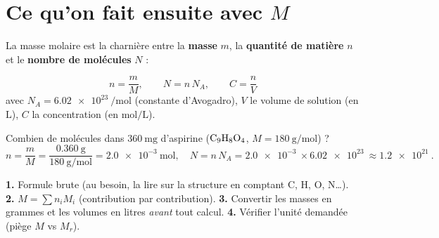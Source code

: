 \documentclass[11pt,a4paper]{article}
\begin{document}
\section{Ce qu'on fait ensuite avec $M$}
La masse molaire est la charnière entre la \textbf{masse} $m$, la \textbf{quantité de matière} $n$ et le \textbf{nombre de molécules} $N$ :
\begin{formule}
\[ n = \dfrac{m}{M}, \qquad N = n\,N_A, \qquad C = \dfrac{n}{V} \]
avec $N_A = \qty{6,02e23}{\per\mol}$ (constante d'Avogadro), $V$ le volume de solution (en $\si{\L}$), $C$ la concentration (en $\si{\mol\per\L}$).
\end{formule}

\begin{exmp}
Combien de molécules dans $\qty{360}{\mg}$ d'aspirine ($\ce{C9H8O4}$, $M=\qty{180}{\g\per\mol}$) ?
\[ n=\frac{m}{M}=\frac{\qty{0,360}{\g}}{\qty{180}{\g\per\mol}}=\qty{2,0e-3}{\mol},\quad
N=n\,N_A=\qty{2,0e-3}{}\times\qty{6,02e23}{}\approx\qty{1,2e21}{}. \]
\end{exmp}

\begin{astuce}
\textbf{1.} Formule brute (au besoin, la lire sur la structure en comptant C, H, O, N\dots). \textbf{2.} $M=\sum n_i M_i$ (contribution par contribution). \textbf{3.} Convertir les masses en grammes et les volumes en litres \emph{avant} tout calcul. \textbf{4.} Vérifier l'unité demandée (piège $M$ vs $M_r$).
\end{astuce}
\end{document}
